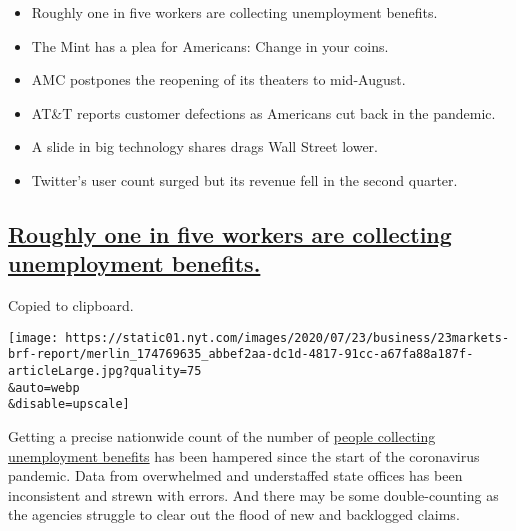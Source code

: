 \begin{itemize}
\item
  \protect\hyperlink{roughly-one-in-five-workers-are-collecting-unemployment-benefits}{}

  Roughly one in five workers are collecting unemployment benefits.
\item
  \protect\hyperlink{coin-shortage-united-states-mint}{}

  The Mint has a plea for Americans: Change in your coins.
\item
  \protect\hyperlink{amc-postpones-the-reopening-of-its-theaters-to-mid-august}{}

  AMC postpones the reopening of its theaters to mid-August.
\item
  \protect\hyperlink{att-reports-customer-defections-as-americans-cut-back-in-the-pandemic}{}

  AT\&T reports customer defections as Americans cut back in the
  pandemic.
\item
  \protect\hyperlink{a-slide-in-big-technology-shares-drags-wall-street-lower}{}

  A slide in big technology shares drags Wall Street lower.
\item
  \protect\hyperlink{twitter-earnings.html}{}

  Twitter's user count surged but its revenue fell in the second
  quarter.
\end{itemize}

\hypertarget{roughly-one-in-five-workers-are-collecting-unemployment-benefits}{%
\subsection{\texorpdfstring{\protect\hyperlink{roughly-one-in-five-workers-are-collecting-unemployment-benefits}{Roughly
one in five workers are collecting unemployment
benefits.}}{Roughly one in five workers are collecting unemployment benefits.}}\label{roughly-one-in-five-workers-are-collecting-unemployment-benefits}}

Copied to clipboard.

\texttt{[image: https://static01.nyt.com/images/2020/07/23/business/23markets-brf-report/merlin\_174769635\_abbef2aa-dc1d-4817-91cc-a67fa88a187f-articleLarge.jpg?quality=75\\\&auto=webp\\\&disable=upscale]}

Getting a precise nationwide count of the number of
\href{https://www.nytimes.com/2020/04/09/business/economy/unemployment-claim-numbers-coronavirus.html}{people
collecting unemployment benefits} has been hampered since the start of
the coronavirus pandemic. Data from overwhelmed and understaffed state
offices has been inconsistent and strewn with errors. And there may be
some double-counting as the agencies struggle to clear out the flood of
new and backlogged claims.


